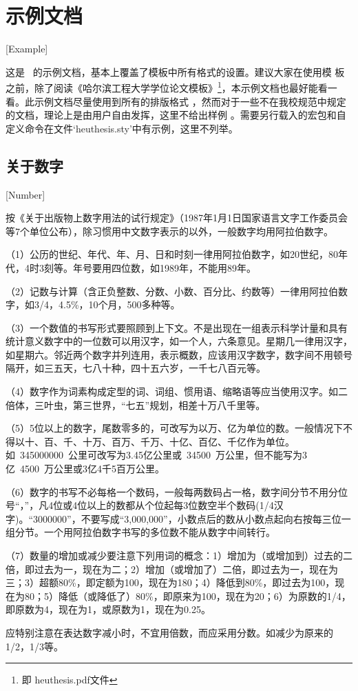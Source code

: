 
\chapter{示例文档}[Example]

这是 \heuthesis\ 的示例文档，基本上覆盖了模板中所有格式的设置。建议大家在使用模
板之前，除了阅读《\heuthesis\:哈尔滨工程大学学位论文模板》\footnote{即
  heuthesis.pdf文件}，本示例文档也最好能看一看。此示例文档尽量使用到所有的排版格式
，然而对于一些不在我校规范中规定的文档，理论上是由用户自由发挥，这里不给出样例
。需要另行载入的宏包和自定义命令在文件`heuthesis.sty'中有示例，这里不列举。

\section{关于数字}[Number]

按《关于出版物上数字用法的试行规定》（1987年1月1日国家语言文字工作委员会等7个单位公布），除习惯用中文数字表示的以外，一般数字均用阿拉伯数字。\par
（1）公历的世纪、年代、年、月、日和时刻一律用阿拉伯数字，如20世纪，80年代，4时3刻等。年号要用四位数，如1989年，不能用89年。\par
（2）记数与计算（含正负整数、分数、小数、百分比、约数等）一律用阿拉伯数字，如3/4，4.5\%，10个月，500多种等。\par
（3）一个数值的书写形式要照顾到上下文。不是出现在一组表示科学计量和具有统计意义数字中的一位数可以用汉字，如一个人，六条意见。星期几一律用汉字，如星期六。邻近两个数字并列连用，表示概数，应该用汉字数字，数字间不用顿号隔开，如三五天，七八十种，四十五六岁，一千七八百元等。\par
（4）数字作为词素构成定型的词、词组、惯用语、缩略语等应当使用汉字。如二倍体，三叶虫，第三世界，“七五”规划，相差十万八千里等。\par
（5）5位以上的数字，尾数零多的，可改写为以万、亿为单位的数。一般情况下不得以十、百、千、十万、百万、千万、十亿、百亿、千亿作为单位。如~\num{345000000}~公里可改写为3.45亿公里或~\num{34500}~万公里，但不能写为3亿~\num{4500}~万公里或3亿4千5百万公里。\par
（6）数字的书写不必每格一个数码，一般每两数码占一格，数字间分节不用分位号“，”，凡4位或4位以上的数都从个位起每3位数空半个数码(1/4汉字)。“\num{3000000}”，不要写成“3,000,000”，小数点后的数从小数点起向右按每三位一组分节。一个用阿拉伯数字书写的多位数不能从数字中间转行。\par
（7）数量的增加或减少要注意下列用词的概念：1）增加为（或增加到）过去的二倍，即过去为一，现在为二；2）增加（或增加了）二倍，即过去为一，现在为三；3）超额80\%，即定额为100，现在为180；4）降低到80\%，即过去为100，现在为80；5）降低（或降低了）80\%，即原来为100，现在为20；6）为原数的1/4，即原数为4，现在为1，或原数为1，现在为0.25。\par
应特别注意在表达数字减小时，不宜用倍数，而应采用分数。如减少为原来的1/2，1/3等。


